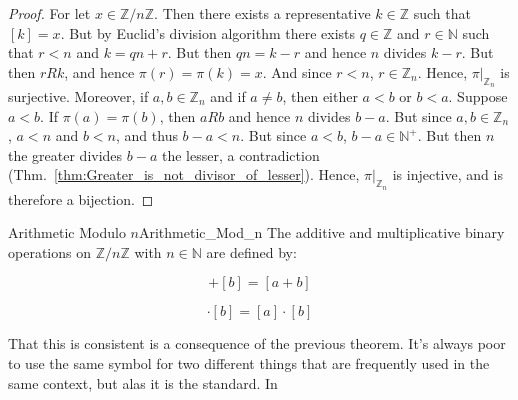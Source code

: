 \documentclass{article}                                                        %
\begin{document}
            \begin{proof}
                For let $x\in\mathbb{Z}/n\mathbb{Z}$. Then there exists a
                representative $k\in\mathbb{Z}$ such that $[k]=x$. But by Euclid's
                division algorithm there exists $q\in\mathbb{Z}$ and
                $r\in\mathbb{N}$ such that $r<n$ and $k=qn+r$. But then
                $qn=k-r$ and hence $n$ divides $k-r$. But then $rRk$, and hence
                $\pi(r)=\pi(k)=x$. And since $r<n$, $r\in\mathbb{Z}_{n}$. Hence,
                $\pi|_{\mathbb{Z}_{n}}$ is surjective. Moreover, if
                $a,b\in\mathbb{Z}_{n}$ and if $a\ne{b}$, then either $a<b$ or $b<a$.
                Suppose $a<b$. If $\pi(a)=\pi(b)$, then $aRb$ and hence $n$ divides
                $b-a$. But since $a,b\in\mathbb{Z}_{n}$, $a<n$ and $b<n$, and thus
                $b-a<n$. But since $a<b$, $b-a\in\mathbb{N}^{+}$. But then $n$ the
                greater divides $b-a$ the lesser, a contradiction
                (Thm.~\ref{thm:Greater_is_not_divisor_of_lesser}). Hence,
                $\pi|_{\mathbb{Z}_{n}}$ is injective, and is therefore a bijection. 
            \end{proof}
            \begin{fdefinition}{Arithmetic Modulo $n$}{Arithmetic_Mod_n}
                The additive and multiplicative binary operations on
                $\mathbb{Z}/n\mathbb{Z}$ with $n\in\mathbb{N}$ are defined by:
                \par
                \begin{minipage}[b]{0.49\textwidth}
                    \centering
                    \begin{equation*}
                        [a]+[b]=[a+b]
                    \end{equation*}
                \end{minipage}
                \hfill
                \begin{minipage}[b]{0.49\textwidth}
                    \centering
                    \begin{equation*}
                        [a]\cdot[b]=[a]\cdot[b]
                    \end{equation*}
                \end{minipage}
            \end{fdefinition}
            That this is consistent is a consequence of the previous theorem. It's
            always poor to use the same symbol for two different things that are
            frequently used in the same context, but alas it is the standard. In
\end{document}
